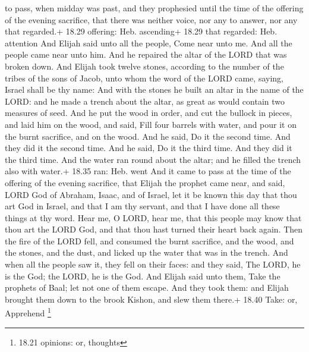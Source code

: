 to pass, when midday was past, and they prophesied until the time of the
offering of the evening sacrifice, that there was neither voice, nor any
to answer, nor any that regarded.+ 18.29 offering: Heb. ascending+ 18.29
that regarded: Heb. attention  And Elijah said unto all the
people, Come near unto me. And all the people came near unto him. And he
repaired the altar of the LORD that was broken down.  And
Elijah took twelve stones, according to the number of the tribes of the
sons of Jacob, unto whom the word of the LORD came, saying, Israel shall
be thy name:  And with the stones he built an altar in the
name of the LORD: and he made a trench about the altar, as great as
would contain two measures of seed.  And he put the wood in
order, and cut the bullock in pieces, and laid him on the wood, and
said, Fill four barrels with water, and pour it on the burnt sacrifice,
and on the wood.  And he said, Do it the second time. And
they did it the second time. And he said, Do it the third time. And they
did it the third time.  And the water ran round about the
altar; and he filled the trench also with water.+ 18.35 ran: Heb. went
 And it came to pass at the time of the offering of the
evening sacrifice, that Elijah the prophet came near, and said, LORD God
of Abraham, Isaac, and of Israel, let it be known this day that thou art
God in Israel, and that I am thy servant, and that I have done all these
things at thy word.  Hear me, O LORD, hear me, that this
people may know that thou art the LORD God, and that thou hast turned
their heart back again.  Then the fire of the LORD fell,
and consumed the burnt sacrifice, and the wood, and the stones, and the
dust, and licked up the water that was in the trench.  And
when all the people saw it, they fell on their faces: and they said, The
LORD, he is the God; the LORD, he is the God.  And Elijah
said unto them, Take the prophets of Baal; let not one of them escape.
And they took them: and Elijah brought them down to the brook Kishon,
and slew them there.+ 18.40 Take: or, Apprehend \footnote{18.21
  opinions: or, thoughts}

